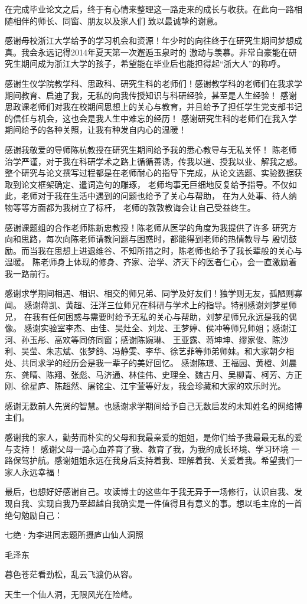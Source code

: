 \cleardoublepage
{}

在完成毕业论文之后，终于有心情来整理这一路走来的成长与收获。在此向一路相随相伴的师长、同窗、朋友以及家人们
致以最诚挚的谢意。

感谢母校浙江大学给予的学习机会和资源！年少时的向往终于在研究生期间梦想成真。我会永远记得2014年夏天第一次邂逅玉泉时的
激动与羡慕。非常自豪能在研究生期间成为浙江大学的孩子，希望能在毕业后也能担得起“浙大人”的称呼。

感谢生仪学院教学科、思政科、研究生科的老师们！感谢教学科的老师们在我求学期间教育、启迪了我，无私的向我传授知识与科研经验，甚至是人生经验！
感谢思政课老师们对我在校期间思想上的关心与教育，并且给予了担任学生党支部书记的信任与机会，这也会是我人生中难忘的经历！
感谢研究生科的老师们在我入学期间给予的各种关照，让我有种发自内心的温暖！

感谢我敬爱的导师陈杭教授在研究生期间给予我的悉心教导与无私关怀！
陈老师治学严谨，对于我在科研学术之路上循循善诱，传我以道、授我以业、解我之惑。
整个研究与论文撰写过程都是在老师耐心的指导下完成，从论文选题、实验数据获取到论文框架确定、遣词造句的雕琢，
老师均事无巨细地反复给予指导。不仅如此，老师对于我在生活中遇到的问题也给予了关心与帮助，
在为人处事、待人纳物等等方面都为我树立了标杆，
老师的敦敦教诲会让自己受益终生。

感谢课题组的合作老师陈新忠教授！陈老师从医学的角度为我提供了许多
研究方向和思路，每次向陈老师请教问题与困惑时，都能得到老师的热情教导与
殷切鼓励。而当我在思想上进退维谷、不知所措之时，陈老师也给予了我长辈般的关心与温暖。
陈老师身上体现的修身、齐家、治学、济天下的医者仁心，会一直激励着我一路前行。

感谢求学期间相遇、相识、相交的师兄弟、同学及好友们！独学则无友，孤陋则寡闻。
感谢蒋凯、黄超、汪洋三位师兄在科研与学术上的指导。特别感谢刘梦星师兄，
在我有任何困惑与需要时给予无私的关心与帮助，刘梦星师兄永远是我的偶像。
感谢实验室李杰、由佳、吴灶全、刘龙、王梦婷、侯冲等师兄师姐；感谢江河、孙玉彤、高欢等同侪同窗；感谢陈婉琳、
王亚露、蒋坤坤、缪家俊、陈沙利、吴莹、朱志斌、张梦鸽、冯静雯、李华、徐艺菲等师弟师妹。和大家朝夕相处、共同求学的经历会是我一辈子的美好回忆。
感谢陈璟、王福园、黄橙、刘晨东、龚晴、陈翔、张彪、马济通、林佳伟、史理全、魏古月、吴柳青、柯芳、方正刚、徐星庐、陈超然、屠铭尘、江宇萱等好友，我会珍藏和大家的欢乐时光。

感谢无数前人先贤的智慧。也感谢求学期间给予自己无数启发的未知姓名的网络博主们。

感谢我的家人，勤劳而朴实的父母和我最亲爱的姐姐，是你们给予我最最无私的爱与支持！
感谢父母一路心血养育了我、教育了我，为我的成长环境、学习环境
一路保驾护航。感谢姐姐永远在我身后支持着我、理解着我、关爱着我。希望我们一家人永远幸福！

最后，也想好好感谢自己。攻读博士的这些年于我无异于一场修行，认识自我、发现自我、实现自我乃至超越自我确实是一件值得且有意义的事。想以毛主席的一首绝句勉励自己：

\bigskip
\centerline{七绝·为李进同志题所摄庐山仙人洞照}
\centerline{毛泽东}
\centerline{暮色苍茫看劲松，乱云飞渡仍从容。}
\centerline{天生一个仙人洞，无限风光在险峰。}

